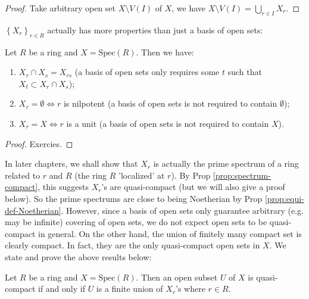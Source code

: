 \documentclass{note-eng}
\begin{document}
\begin{proof}
    Take arbitrary open set $X \setminus V(I)$ of $X$, we have $X \setminus V(I) = \bigcup\limits_{r \in I} X_r$.
\end{proof}

$\left\lbrace X_r \right\rbrace_{r \in R}$ actually has more properties than just a basis of open sets:

\begin{proposition}
    Let $R$ be a ring and $X = \mathrm{Spec}(R)$. Then we have:
    \begin{enumerate}
        \item $X_r \cap X_s = X_{rs}$ (a basis of open sets only requires some $t$ such that $X_{t} \subset X_r \cap X_s$);
        \item $X_{r} = \emptyset \Leftrightarrow r$ is nilpotent (a basis of open sets is not required to contain $\emptyset$);
        \item $X_{r} = X \Leftrightarrow r$ is a unit (a basis of open sets is not required to contain $X$).
    \end{enumerate}
\end{proposition}

\begin{proof}
    Exercies.
\end{proof}

In later chapters, we shall show that $X_r$ is actually the prime spectrum of a ring related to $r$ and $R$ (the ring $R$ 'localized' at $r$). By Prop \ref{prop:spectrum-compact}, this suggests $X_r$'s are quasi-compact (but we will also give a proof below). So the prime spectrums are close to being Noetherian by Prop \ref{prop:equi-def-Noetherian}. However, since a basis of open sets only guarantee arbitrary (e.g. may be infinite) covering of open sets, we do not expect open sets to be quasi-compact in general. On the other hand, the union of finitely many compact set is clearly compact. In fact, they are the only quasi-compact open sets in $X$. We state and prove the above results below:

\begin{proposition}
    Let $R$ be a ring and $X = \mathrm{Spec}(R)$. Then an open subset $U$ of $X$ is quasi-compact if and only if $U$ is a finite union of $X_r$'s where $r \in R$.
\end{proposition}
\end{document}
